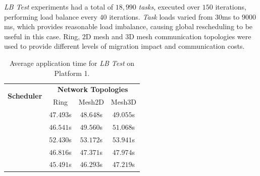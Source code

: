 \textit{LB Test} experiments had a total of $18,990$ \textit{tasks}, executed over $150$ iterations, performing load balance every $40$ iterations.
\textit{Task} loads varied from $30$ms to $9000$ms, which provides reasonable load imbalance, causing global rescheduling to be useful in this case.
Ring, $2$D mesh and $3$D mesh communication topologies were used to provide different levels of migration impact and communication costs.


\begin{table}[h]
	\centering
    \caption{Average application time for \textit{LB Test} on Platform 1.}
	\begin{tabular}{l  c  c  c}
    \toprule
	\multirow{2}{*}{\textbf{Scheduler}} 	& \multicolumn{3}{c}{\textbf{Network Topologies}} \\ \cmidrule{2-4}
 								& Ring & Mesh2D & Mesh3D \\
	\midrule
        \distributedlb 		& $47.493$s & $48.648$s & $49.055$s \\
        \greedylb 			& $46.541$s & $49.560$s & $51.068$s \\
        \dummylb 			& $52.430$s & $53.172$s & $53.941$s \\
        \packdrop 			& $46.816$s & $47.371$s & $47.974$s \\
         			& $45.491$s & $46.293$s & $47.219$s \\
        \bottomrule
	\end{tabular}
    \label{tab:lbtest:apptime}
\end{table}



